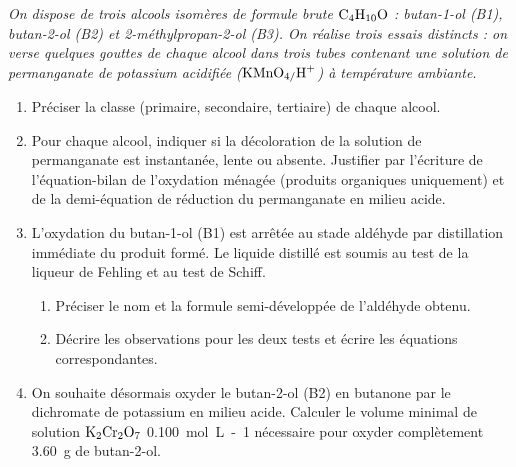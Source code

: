 \documentclass[11pt]{article}
\begin{document}
\begin{exercice}
\emph{On dispose de trois alcools isomères de formule brute $\ce{C4H10O}$ : butan-1-ol (B1), butan-2-ol (B2) et 2-méthylpropan-2-ol (B3). On réalise trois essais distincts : on verse quelques gouttes de chaque alcool dans trois tubes contenant une solution de permanganate de potassium acidifiée ($\ce{KMnO4/H+}$) à température ambiante.}
\begin{enumerate}
    \item Préciser la classe (primaire, secondaire, tertiaire) de chaque alcool.
    \item Pour chaque alcool, indiquer si la décoloration de la solution de permanganate est instantanée, lente ou absente. Justifier par l'écriture de l'équation-bilan de l'oxydation ménagée (produits organiques uniquement) et de la demi-équation de réduction du permanganate en milieu acide.
    \item L'oxydation du butan-1-ol (B1) est arrêtée au stade aldéhyde par distillation immédiate du produit formé. Le liquide distillé est soumis au test de la liqueur de Fehling et au test de Schiff.
    \begin{enumerate}
        \item Préciser le nom et la formule semi-développée de l'aldéhyde obtenu.
        \item Décrire les observations pour les deux tests et écrire les équations correspondantes.
    \end{enumerate}
    \item On souhaite désormais oxyder le butan-2-ol (B2) en butanone par le dichromate de potassium en milieu acide. Calculer le volume minimal de solution $\ce{K2Cr2O7}$ \SI{0,100}{mol.L-1} nécessaire pour oxyder complètement \SI{3,60}{g} de butan-2-ol.
\end{enumerate}
\end{exercice}
\end{document}
